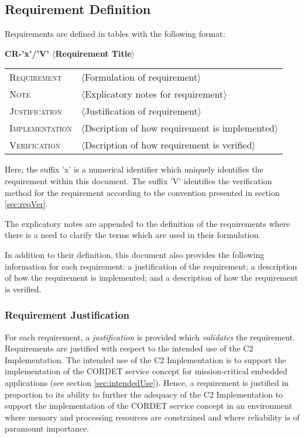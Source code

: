 \documentclass{pnp_article}
\begin{document}
\subsection{Requirement Definition}\label{sec:reqDef}
Requirements are defined in tables with the following format:

\hspace{0.2cm}\textbf{CR-'x'/'V' \hspace{0.9cm} $\langle$Requirement Title$\rangle$}
\vspace{-10pt}

\begin{longtable}{p{2.7cm}P{8.5cm}}
\hline
\textsc{Requirement} & $\langle$Formulation of requirement$\rangle$ \\
\textsc{Note} & $\langle$Explicatory notes for requirement$\rangle$ \\
\textsc{Justification} & $\langle$Justification of requirement$\rangle$ \\
\textsc{Implementation} & $\langle$Dscription of how requirement is implemented$\rangle$ \\ 
\textsc{Verification} & $\langle$Dscription of how requirement is verified$\rangle$ \\
\hline
\end{longtable}

Here, the suffix 'x' is a numerical identifier which uniquely identifies the requirement
within this document. The suffix 'V' identifies the verification method for the requirement according to the convention presented in section \ref{sec:reqVer}.

The explicatory notes are appended to the definition of the requirements where there is a need to clarify the terms which are used in their formulation.

In addition to their definition, this document also provides the following information for each requirement: a justification of the requirement; a description of how the requirement is implemented; and a description of how the requirement is verified. 

\subsubsection{Requirement Justification}
For each requirement, a \emph{justification} is provided which \emph{validates} the requirement. Requirements are justified with respect to the intended use of the C2 Implementation. The intended use of the C2 Implementation is to support the implementation of the CORDET service concept for mission-critical embedded applications (see section \ref{sec:intendedUse}).  Hence, a requirement is justified in proportion to its ability to further the adequacy of the C2 Implementation to support the implementation of the CORDET service concept in an environment where memory and processing resources are constrained and where reliability is of paramount importance. 
\end{document}
